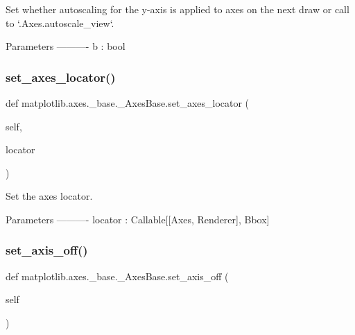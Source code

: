 \begin{DoxyVerb}Set whether autoscaling for the y-axis is applied to axes on the next
draw or call to `.Axes.autoscale_view`.

Parameters
----------
b : bool
\end{DoxyVerb}
 \mbox{\label{classmatplotlib_1_1axes_1_1__base_1_1__AxesBase_a9050a273fc42b805ec0709c35c59f92f}} 
\subsubsection{\texorpdfstring{set\+\_\+axes\+\_\+locator()}{set\_axes\_locator()}}
{\footnotesize\ttfamily def matplotlib.\+axes.\+\_\+base.\+\_\+\+Axes\+Base.\+set\+\_\+axes\+\_\+locator (\begin{DoxyParamCaption}\item[{}]{self,  }\item[{}]{locator }\end{DoxyParamCaption})}

\begin{DoxyVerb}Set the axes locator.

Parameters
----------
locator : Callable[[Axes, Renderer], Bbox]
\end{DoxyVerb}
 \mbox{\label{classmatplotlib_1_1axes_1_1__base_1_1__AxesBase_a081cde5870b8398fce8f85a81ebc1957}} 
\subsubsection{\texorpdfstring{set\+\_\+axis\+\_\+off()}{set\_axis\_off()}}
{\footnotesize\ttfamily def matplotlib.\+axes.\+\_\+base.\+\_\+\+Axes\+Base.\+set\+\_\+axis\+\_\+off (\begin{DoxyParamCaption}\item[{}]{self }\end{DoxyParamCaption})}

